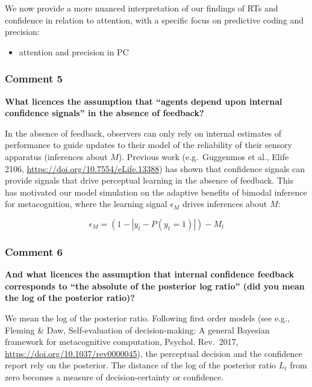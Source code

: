 \documentclass[
]{article}
\providecommand{\tightlist}{%
  \setlength{\itemsep}{0pt}\setlength{\parskip}{0pt}}
\begin{document}
We now provide a more nuanced interpretation of our findings of RTs and
confidence in relation to attention, with a specific focus on predictive
coding and precision:

\begin{itemize}
\tightlist
\item
  attention and precision in PC
\end{itemize}

\hypertarget{comment-5}{%
\subsubsection{Comment 5}\label{comment-5}}

\textbf{What licences the assumption that ``agents depend upon internal
confidence signals'' in the absence of feedback?}

In the absence of feedback, observers can only rely on internal
estimates of performance to guide updates to their model of the
reliability of their sensory apparatus (inferences about \(M\)).
Previous work (e.g.~Guggenmos et al., Elife 2106,
\url{https://doi.org/10.7554/eLife.13388}) has shown that confidence
signals can provide signals that drive perceptual learning in the
absence of feedback. This has motivated our model simulation on the
adaptive benefits of bimodal inference for metacognition, where the
learning signal \(\epsilon_M\) drives inferences about \(M\):

\begin{equation}
\epsilon_M = (1-|y_t - P(y_t = 1)|) - M_t
\end{equation}

\hypertarget{comment-6}{%
\subsubsection{Comment 6}\label{comment-6}}

\textbf{And what licences the assumption that internal confidence
feedback corresponds to ``the absolute of the posterior log ratio'' (did
you mean the log of the posterior ratio)?}

We mean the log of the posterior ratio. Following first order models
(see e.g., Fleming \& Daw, Self-evaluation of decision-making: A general
Bayesian framework for metacognitive computation, Psychol. Rev.~2017,
\url{https://doi.org/10.1037/rev0000045}), the perceptual decision and
the confidence report rely on the posterior. The distance of the log of
the posterior ratio \(L_t\) from zero becomes a measure of
decision-certainty or confidence.
\end{document}
